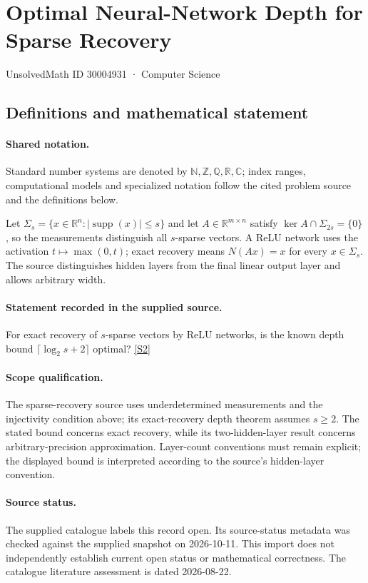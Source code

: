 \documentclass[11pt]{article}
\newcommand{\sref}[2]{\hyperlink{source:#1:#2}{[S#2]}}
\begin{document}
\setcounter{section}{30004930}
\section{Optimal Neural-Network Depth for Sparse Recovery}\label{30004931}
{\small\sffamily UnsolvedMath ID 30004931 · Computer Science}
\subsection{Definitions and mathematical statement}

\paragraph{Shared notation.}Standard number systems are denoted by $\mathbb N,\mathbb Z,\mathbb Q,\mathbb R,\mathbb C$; index ranges, computational models and specialized notation follow the cited problem source and the definitions below.


Let $\Sigma_s=\{x\in\mathbb R^n:|\operatorname{supp}(x)|\leq s\}$ and let $A\in\mathbb R^{m\times n}$ satisfy $\ker A\cap\Sigma_{2s}=\{0\}$, so the measurements distinguish all $s$-sparse vectors. A ReLU network uses the activation $t\mapsto\max(0,t)$; exact recovery means $N(Ax)=x$ for every $x\in\Sigma_s$. The source distinguishes hidden layers from the final linear output layer and allows arbitrary width.
\paragraph{Statement recorded in the supplied source.}
For exact recovery of $s$-sparse vectors by ReLU networks, is the known depth bound $\lceil\log_2s+2\rceil$ optimal? \sref{30004931}{2}
\paragraph{Scope qualification.}
The sparse-recovery source uses underdetermined measurements and the injectivity condition above; its exact-recovery depth theorem assumes $s\geq2$. The stated bound concerns exact recovery, while its two-hidden-layer result concerns arbitrary-precision approximation. Layer-count conventions must remain explicit; the displayed bound is interpreted according to the source's hidden-layer convention.
\paragraph{Source status.}
The supplied catalogue labels this record open. Its source-status metadata was checked against the supplied snapshot on 2026-10-11. This import does not independently establish current open status or mathematical correctness. The catalogue literature assessment is dated 2026-08-22.
\end{document}
